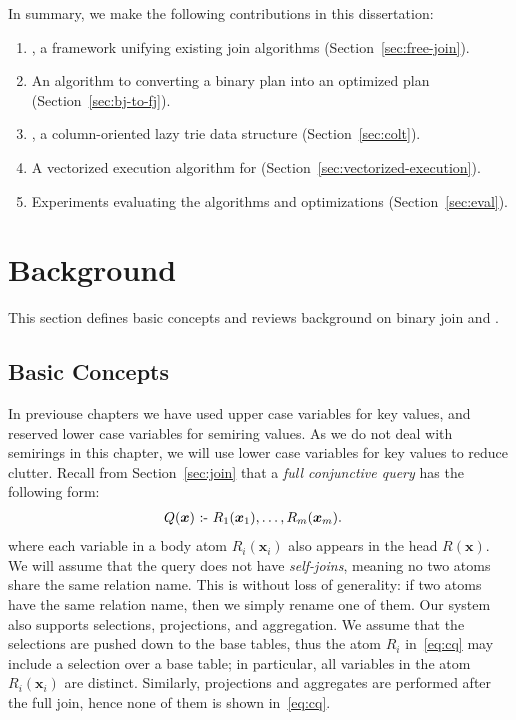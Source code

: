   
In summary, we make the following contributions in this dissertation:
\begin{enumerate}
  \item \FJ, a framework unifying existing join algorithms (Section~\ref{sec:free-join}).
  \item An algorithm to converting a binary plan into an
    optimized \FJ plan (Section~\ref{sec:bj-to-fj}).
  \item \COLT, a column-oriented lazy trie data structure (Section~\ref{sec:colt}).
  \item A vectorized execution algorithm for \FJ (Section~\ref{sec:vectorized-execution}).
  \item Experiments evaluating the algorithms and optimizations (Section~\ref{sec:eval}).
\end{enumerate}

\section{Background}\label{sec:background:fj}

This section defines basic concepts and reviews background on binary
join and \GJ.

\subsection{Basic Concepts}\label{sec:basic-concepts}

In previouse chapters we have used upper case variables for key values, 
 and reserved lower case variables for semiring values. 
As we do not deal with semirings in this chapter, 
 we will use lower case variables for key values to reduce clutter.
Recall from Section~\ref{sec:join} that a \emph{full conjunctive query} 
 has the following form:
%
\begin{align}
  Q(\bm x) \text{ :- } & R_1(\bm x_1), \ldots, R_m(\bm x_m). \label{eq:cq}
\end{align}
%
where each variable in a body atom $R_i({\bm x_i})$ also appears 
 in the head $R({\bm x})$.
We will assume that the query does not have {\em self-joins},
 meaning no two atoms share the same relation name.
This is without loss of generality: if two atoms have the same
relation name, then we simply rename one of them.  
Our system also supports selections, projections, and aggregation.  
We assume that the selections are pushed down to the base tables, thus the atom $R_i$
in~\eqref{eq:cq} may include a selection over a base table; in
particular, all variables in the atom $R_i(\bm x_i)$ are distinct.
Similarly, projections and aggregates are performed after the full
join, hence none of them is shown in~\eqref{eq:cq}.


